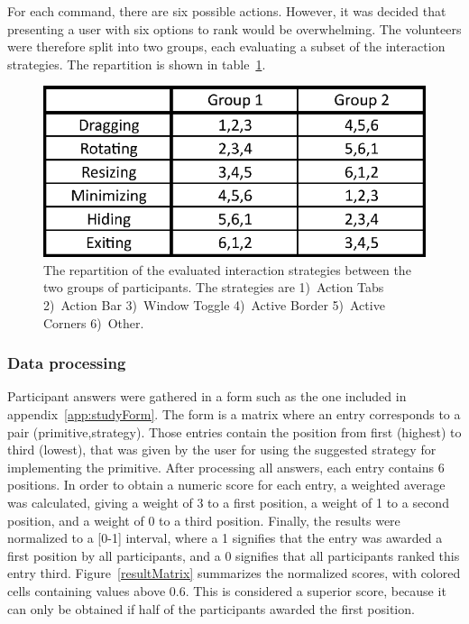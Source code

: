 For each command, there are six possible actions.
However, it was decided that presenting a user with six options to rank would be overwhelming.
The volunteers were therefore split into two groups, each evaluating a subset of the interaction strategies.
The repartition is shown in table~\ref{groups}.

\begin{figure}[htb]
  \centering
    \includegraphics[scale=1]{images/groups}
  \caption{The repartition of the evaluated interaction strategies between the two groups of participants. The strategies are 1)~Action Tabs 2)~Action Bar 3)~Window Toggle 4)~Active Border 5)~Active Corners 6)~Other.}
  \label{groups}
\end{figure}


\subsubsection{Data processing}

Participant answers were gathered in a form such as the one included in appendix~\ref{app:studyForm}.
The form is a matrix where an entry corresponds to a pair (primitive,strategy).
Those entries contain the position from first (highest) to third (lowest), that was given by the user for using the suggested strategy for implementing the primitive.
After processing all answers, each entry contains 6 positions.
In order to obtain a numeric score for each entry, a weighted average was calculated, giving a weight of 3 to a first position, a weight of 1 to a second position, and a weight of 0 to a third position.
Finally, the results were normalized to a [0-1] interval, where a 1 signifies that the entry was awarded a first position by all participants, and a 0 signifies that all participants ranked this entry third.
Figure~\ref{resultMatrix} summarizes the normalized scores, with colored cells containing values above 0.6.
This is considered a superior score, because it can only be obtained if half of the participants awarded the first position.

